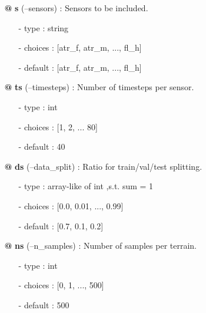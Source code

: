 {\begin{minipage}{\textwidth}
\begin{tcolorbox}[boxsep=0pt,top=10pt,left=10pt,right=10pt, bottom=10pt, arc=0pt, auto outer arc, colback=white, colframe=lightgray]
\begin{itemize}
\item[\textbf{@}] \textbf{s} (--sensors) : Sensors to be included.
\begin{itemize}
\item[-] type    \hspace{15pt}	: string 
\item[-] choices \hspace{4pt} 	: [atr\_f, atr\_m, ..., fl\_h]
\item[-] default \hspace{4pt} 	: [atr\_f, atr\_m, ..., fl\_h] 
\end{itemize}
\item[\textbf{@}] \textbf{ts} (--timesteps) : Number of timesteps per sensor.
\begin{itemize}
\item[-] type    \hspace{15pt}	: int 
\item[-] choices \hspace{4pt} 	: [1, 2, ... 80]
\item[-] default \hspace{4pt} 	: 40
\end{itemize}
\item[\textbf{@}] \textbf{ds} (--data\_split) : Ratio for train/val/test splitting.
\begin{itemize}
\item[-] type    \hspace{15pt}	: array-like of int ,s.t. sum = 1 
\item[-] choices \hspace{4pt} 	: [0.0, 0.01, ..., 0.99]
\item[-] default \hspace{4pt} 	: [0.7, 0.1, 0.2]
\end{itemize}
\item[\textbf{@}] \textbf{ns} (--n\_samples) : Number of samples per terrain.
\begin{itemize}
\item[-] type    \hspace{15pt}	: int 
\item[-] choices \hspace{4pt} 	: [0, 1, ..., 500]
\item[-] default \hspace{4pt} 	: 500
\end{itemize}
\end{itemize}
\end{tcolorbox}
\end{minipage}}

